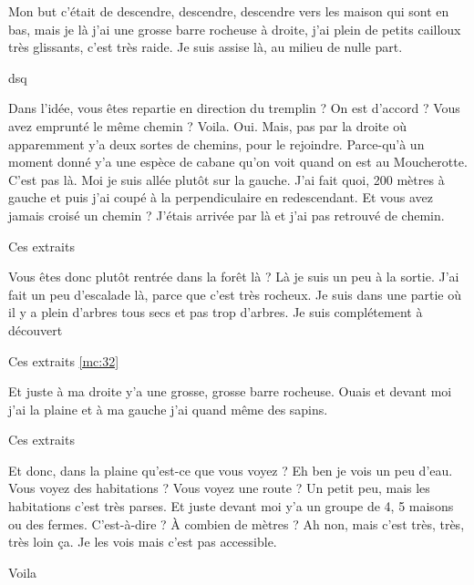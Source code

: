\begin{dialogue*}
  \Req {} Mon but c’était de descendre, descendre,
  descendre vers les maison qui sont en bas,  mais je
  là j’ai une grosse barre rocheuse à droite,  j’ai
  plein de petits cailloux très glissants,  c’est très
  raide.  Je suis assise là, au milieu de nulle part.
\end{dialogue*}
% 
dsq

\begin{dialogue*}
  \Sec {} Dans l’idée, vous êtes repartie en direction
  du tremplin ? On est d’accord ? Vous avez emprunté le même chemin ?
  \Req {} Voila. Oui.  Mais, pas par la
  droite où  apparemment y’a deux sortes de chemins,
  pour le rejoindre.  Parce-qu’à un moment donné y’a
  une espèce de cabane qu’on voit quand on est au Moucherotte. C’est
  pas là.  Moi je suis allée plutôt sur la
  gauche. J’ai fait quoi, 200 mètres à gauche et  puis
  j’ai coupé à la perpendiculaire en redescendant.
  \Sec {} Et vous avez jamais croisé un chemin ?
  \Req {} J’étais arrivée par là et j’ai pas retrouvé de
  chemin.
\end{dialogue*}
% 
Ces extraits

\begin{dialogue*}
  \Sec {} Vous êtes donc plutôt rentrée dans la forêt là ?
  \Req {} Là je suis un peu à la
  sortie.  J’ai fait un peu d’escalade là,
   parce que c’est très rocheux.  Je
  suis dans une partie où il y a plein d’arbres tous secs et pas trop
  d’arbres. Je suis complétement à découvert
\end{dialogue*}
% 
Ces extraits \ref{mc:32}


\begin{dialogue*}
  \Req {} Et juste à ma droite y’a une grosse, grosse
  barre rocheuse.  Ouais et devant moi j’ai la plaine
  et  à ma gauche j’ai quand même des sapins.
\end{dialogue*}
% 
Ces extraits


\begin{dialogue*}
  \Sec {} Et donc, dans la plaine qu’est-ce que vous
  voyez ?
  \Req {} Eh ben je vois un peu d’eau.
  \Sec {} Vous voyez des habitations ? Vous voyez une
  route ?
  \Req {} Un petit peu, mais les habitations c’est très
  parses.  Et juste devant moi y’a un groupe de 4, 5
  maisons ou des fermes.
  \Sec {} C’est-à-dire ? À combien de mètres ?
  \Req {} Ah non, mais c’est très, très, très loin
  ça. Je les vois mais c’est pas accessible.
\end{dialogue*}
% 
Voila


